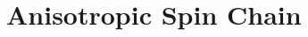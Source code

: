 \documentclass[twoside]{report}
\begin{document}
 \chapter{Anisotropic Spin Chain}
 \label{chap:main}
 
%  
  \printbibliography
\end{document}
